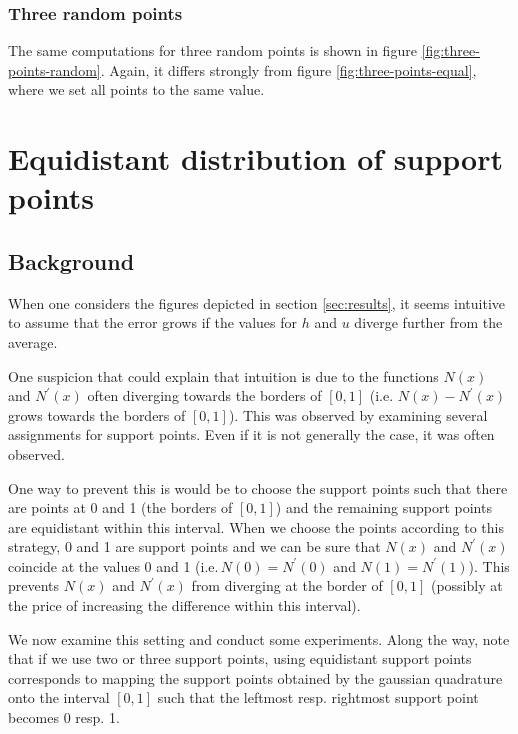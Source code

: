 \documentclass{article}
\begin{document}


\subsubsection{Three random points}
\label{sec:three-random-points}

The same computations for three random points is shown in figure \ref{fig:three-points-random}. Again, it differs strongly from figure \ref{fig:three-points-equal}, where we set all points to the same value.



\section{Equidistant distribution of support points}
\label{sec:equidistant-distribution-of-support-points}

\subsection{Background}
\label{sec:equidistant-support-points-background}

When one considers the figures depicted in section \ref{sec:results}, it seems intuitive to assume that the error grows if the values for $h$ and $u$ diverge further from the average.

One suspicion that could explain that intuition is due to the functions $N\left(x\right)$ and $N^\prime\left(x\right)$ often diverging towards the borders of $[0,1]$ (i.e. $N(x)-N^\prime(x)$ grows towards the borders of $[0,1]$). This was observed by examining several assignments for support points. Even if it is not generally the case, it was often observed.

One way to prevent this is would be to choose the support points such that there are points at 0 and 1 (the borders of $[0,1]$) and the remaining support points are equidistant within this interval. When we choose the points according to this strategy, 0 and 1 are support points and we can be sure that $N\left(x\right)$ and $N^\prime\left(x\right)$ coincide at the values 0 and 1 (i.e.\,$N\left(0\right)=N^\prime\left(0\right)$ and $N\left(1\right)=N^\prime\left(1\right)$). This prevents $N(x)$ and $N^\prime(x)$ from diverging at the border of $[0,1]$ (possibly at the price of increasing the difference within this interval).

We now examine this setting and conduct some experiments. Along the way, note that if we use two or three support points, using equidistant support points corresponds to mapping the support points obtained by the gaussian quadrature onto the interval $[0,1]$ such that the leftmost resp. rightmost support point becomes 0 resp. 1.
\end{document}
